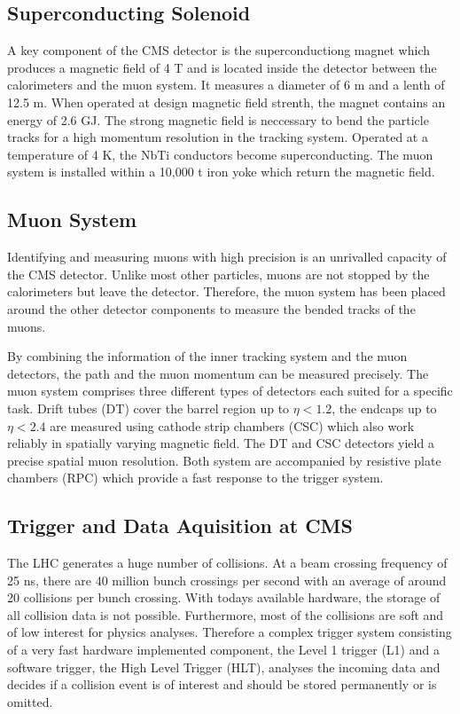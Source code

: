 \subsection{Superconducting Solenoid}

A key component of the CMS detector is the superconductiong magnet which
produces a magnetic field of 4 T and is located inside the detector between the
calorimeters and the muon system. It measures a diameter of 6 m and a lenth of
12.5 m. When operated at design magnetic field strenth, the magnet contains an
energy of 2.6 GJ. The strong magnetic field is neccessary to bend the particle
tracks for a high momentum resolution in the tracking system. Operated at a
temperature of 4 K, the NbTi conductors become superconducting. The muon system
is installed within a 10,000 t iron yoke which return the magnetic field.

\subsection{Muon System}

Identifying and measuring muons with high precision is an unrivalled capacity of
the CMS detector. Unlike most other particles, muons are not stopped by the
calorimeters but leave the detector. Therefore, the muon system has been placed
around the other detector components to measure the bended tracks of the muons.

By combining the information of the inner tracking system and the muon
detectors, the path and the muon momentum can be measured precisely. The muon
system comprises three different types of detectors each suited for a specific
task. Drift tubes (DT) cover the barrel region up to $\eta < 1.2$, the endcaps
up to $\eta < 2.4$ are measured using cathode strip chambers (CSC) which also
work reliably in spatially varying magnetic field. The DT and CSC detectors
yield a precise spatial muon resolution. Both system are accompanied by
resistive plate chambers (RPC) which provide a fast response to the trigger
system.

\subsection{Trigger and Data Aquisition at CMS}

The LHC generates a huge number of collisions. At a beam crossing frequency of
25 ns, there are 40 million bunch crossings per second with an average of around
20 collisions per bunch crossing. With todays available hardware, the storage of
all collision data is not possible. Furthermore, most of the collisions are soft
and of low interest for physics analyses. Therefore a complex trigger system
consisting of a very fast hardware implemented component, the Level 1 trigger
(L1) and a software trigger, the High Level Trigger (HLT), analyses the incoming
data and decides if a collision event is of interest and should be stored
permanently or is omitted.

